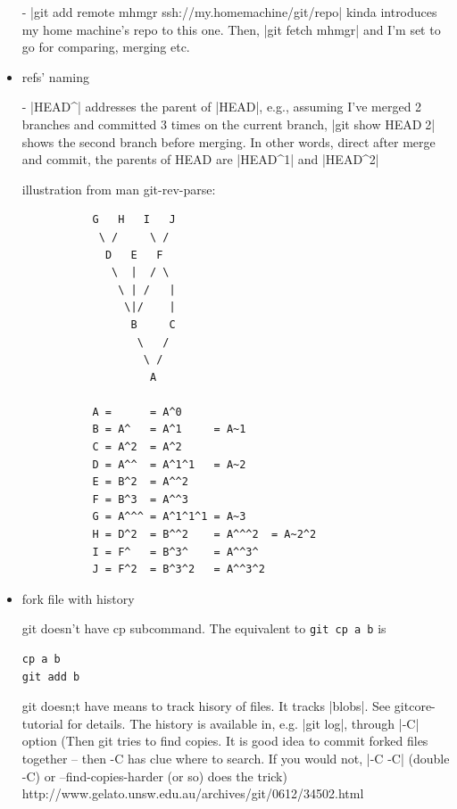 \begin{itemize}
- |git add remote mhmgr ssh://my.homemachine/git/repo| kinda introduces
  my home machine's repo to this one. Then, |git fetch mhmgr| and I'm
  set to go for comparing, merging etc.

\item{refs' naming}

- |HEAD^| addresses the parent of |HEAD|, e.g., assuming I've
  merged 2 branches and committed 3 times on the current branch, 
  |git show HEAD^^^2| shows the second branch before merging. In
  other words, direct after merge and commit, the parents of HEAD are
  |HEAD^1|  and |HEAD^2|  
   
   illustration from man git-rev-parse:
   
   \begin{code} \begin{verbatim}
           G   H   I   J
            \ /     \ /
             D   E   F
              \  |  / \
               \ | /   |
                \|/    |
                 B     C
                  \   /
                   \ /
                    A

           A =      = A^0
           B = A^   = A^1     = A~1
           C = A^2  = A^2
           D = A^^  = A^1^1   = A~2
           E = B^2  = A^^2
           F = B^3  = A^^3
           G = A^^^ = A^1^1^1 = A~3
           H = D^2  = B^^2    = A^^^2  = A~2^2
           I = F^   = B^3^    = A^^3^
           J = F^2  = B^3^2   = A^^3^2

\end{verbatim} \end{code}

\item{fork file with history}

git doesn't have cp subcommand. The equivalent to \verb+git cp a b+ is 
\begin{code}\begin{verbatim}
cp a b
git add b
\end{verbatim} \end{code}

git doesn;t have means to track hisory of files. It tracks |blobs|.
See gitcore-tutorial for details. The history is available in, e.g.
%
|git log|, through |-C| option (Then git tries to find copies.
It is good idea to commit forked files together -- then -C has clue
where to search. If you would not, |-C -C| (double -C) or
--find-copies-harder (or so) does the trick)
http://www.gelato.unsw.edu.au/archives/git/0612/34502.html

\end{itemize}


